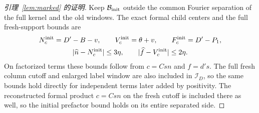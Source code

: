 \documentclass[11pt,a4paper]{article}
\numberwithin{equation}{section}
\numberwithin{figure}{section}
\theoremstyle{definition}
\theoremstyle{remark}
\begin{document}
\begin{proof}[引理~\ref{lem:marked} 的证明]
Keep \(\mathcal B_{\rm init}\) outside the common Fourier separation
of the full kernel and the old windows.  The exact
formal child centers and the full fresh-support bounds are
\begin{equation}\label{eq:initial-canonical-lengths}
 \begin{gathered}
 N_c^{\rm init}=D'-B-v,\qquad V_c^{\rm init}=\theta+v,\qquad
 F_c^{\rm init}=D'-P_1,\\
 |\widehat n-N_c^{\rm init}|\le3\eta,\qquad
 |\widehat f-V_c^{\rm init}|\le2\eta.
 \end{gathered}
\end{equation}
On factorized terms these bounds follow from \(c=Csn\) and \(f=d's\).
The full fresh column cutoff and enlarged label window are also included
in \(\mathcal I_D\), so the same bounds hold directly for independent
terms later added by positivity.  The reconstructed formal product
\(c=Csn\) on the fresh cutoff is included there as well, so the initial
prefactor bound holds on its entire separated side.


\end{proof}
\end{document}
